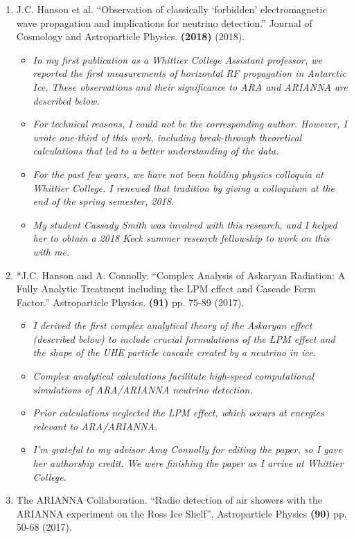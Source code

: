 \documentclass[../../main.tex]{subfiles}
\begin{document}
\begin{enumerate}
\item J.C. Hanson et al. ``Observation of classically ‘forbidden’ electromagnetic wave propagation and implications for neutrino detection.'' Journal of Cosmology and Astroparticle Physics. \textbf{(2018)} (2018).
\begin{itemize}
\item \textit{In my first publication as a Whittier College Assistant professor, we reported the first measurements of horizontal RF propagation in Antarctic Ice.  These observations and their significance to ARA and ARIANNA are described below.}
\item \textit{For technical reasons, I could not be the corresponding author.  However, I wrote one-third of this work, including break-through theoretical calculations that led to a better understanding of the data.}
\item \textit{For the past few years, we have not been holding physics colloquia at Whittier College.  I renewed that tradition by giving a colloquium at the end of the spring semester, 2018.}
\item \textit{My student Cassady Smith was involved with this research, and I helped her to obtain a 2018 Keck summer research fellowship to work on this with me.}
\end{itemize}
\item *J.C. Hanson and A. Connolly. ``Complex Analysis of Askaryan Radiation: A Fully Analytic Treatment including the LPM effect and Cascade Form Factor.'' Astroparticle Physics. \textbf{(91)} pp. 75-89 (2017).
\begin{itemize}
\item \textit{I derived the first complex analytical theory of the Askaryan effect (described below) to include crucial formulations of the LPM effect and the shape of the UHE particle cascade created by a neutrino in ice.}
\item \textit{Complex analytical calculations facilitate high-speed computational simulations of ARA/ARIANNA neutrino detection.}
\item \textit{Prior calculations neglected the LPM effect, which occurs at energies relevant to ARA/ARIANNA.}
\item \textit{I'm grateful to my advisor Amy Connolly for editing the paper, so I gave her authorship credit.  We were finishing the paper as I arrive at Whittier College.}
\end{itemize}
\item The ARIANNA Collaboration. ``Radio detection of air showers with the ARIANNA experiment on the Ross Ice Shelf'', Astroparticle Physics \textbf{(90)} pp. 50-68 (2017).

\end{enumerate}
\end{document}
